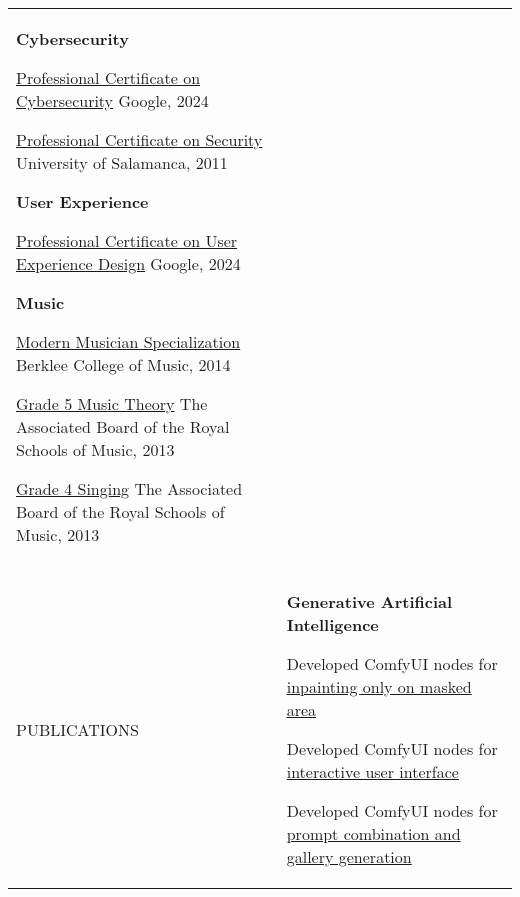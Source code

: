 \documentclass[letterpaper,10pt,oneside]{article}
\newcommand{\DatestampY}[1]{#1}
\newcommand{\itemspacingtwo}{\vspace{0.08cm}}
\newcommand{\sref}[2]{%
    \href{https://0/local/attachments/#1}{\textcolor{hiddenblue}{#2}}%
}
\newenvironment{body}
{\par\par
\begin{longtable}{p{0.145\textwidth}p{0.81\textwidth}}}
{\par\end{longtable}\par}
\renewcommand{\section}[3]{\\[-0.35cm]\pdfbookmark[2]{#2}{#3}\\%
\raggedleft  %
{\fontsize{9.5pt}{9.5pt}\selectfont\bfseries\raggedright%
\MakeUppercase{#1}}&}
\begin{document}
\begin{body}
\textbf{Cybersecurity}
\begin{comp}
\item \sref{Certificate-Coursera-Google-Cybersecurity.pdf}{Professional Certificate on Cybersecurity} \textemdash{ }Google, \DatestampY{2024}
\item \sref{Certificate-Certyred.pdf}{Professional Certificate on Security} \textemdash{ }University of Salamanca, \DatestampY{2011}
\end{comp}
\itemspacingtwo

\textbf{User Experience}
\begin{comp}
\item \sref{Certificate-Coursera-Google-UX-Design.pdf}{Professional Certificate on User Experience Design} \textemdash{ }Google, \DatestampY{2024}
\end{comp}
\itemspacingtwo

\textbf{Music}
\begin{comp}
\item \sref{Diploma-BerkleeCollege-ModernMusician.pdf}{Modern Musician Specialization} \textemdash{ }Berklee College of Music, \DatestampY{2014}
\item \sref{Diploma-ABRSM-MusicTheory5.pdf}{Grade 5 Music Theory} \textemdash{ }The Associated Board of the Royal Schools of Music, \DatestampY{2013}
\item \sref{Diploma-ABRSM-SingingGrade4.pdf}{Grade 4 Singing} \textemdash{ }The Associated Board of the Royal Schools of Music, \DatestampY{2013}
\end{comp}
\itemspacingtwo


\section{Publications}{Publications}{PDF:Publications}
\textbf{Generative Artificial Intelligence}
\begin{comp}
\item Developed ComfyUI nodes for \href{https://github.com/lquesada/ComfyUI-Inpaint-CropAndStitch}{inpainting only on masked area}
\item Developed ComfyUI nodes for \href{https://github.com/lquesada/ComfyUI-Interactive}{interactive user interface}
\item Developed ComfyUI nodes for \href{https://github.com/lquesada/ComfyUI-Prompt-Combinator}{prompt combination and gallery generation}
\end{comp}
\itemspacingtwo


\end{body}
\end{document}
